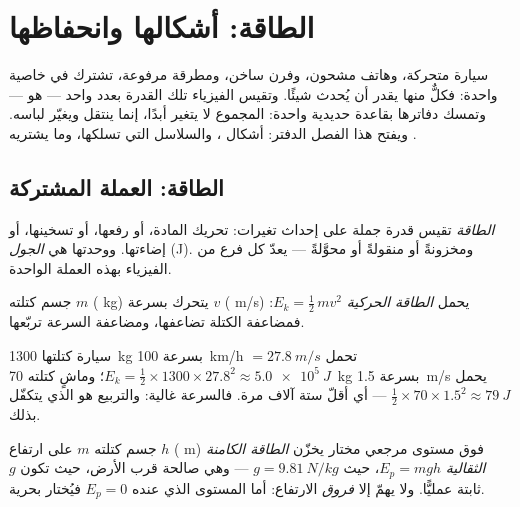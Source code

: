 \chapter{الطاقة: أشكالها وانحفاظها}\label{ch:g10:energy-conservation}

سيارة متحركة، وهاتف مشحون، وفرن ساخن، ومطرقة مرفوعة، تشترك في
خاصية واحدة: فكلٌّ منها يقدر أن يُحدث شيئًا. وتقيس الفيزياء تلك
القدرة بعدد واحد --- هو  --- وتمسك دفاترها
بقاعدة حديدية واحدة: المجموع لا يتغير أبدًا، إنما ينتقل ويغيّر
لباسه. ويفتح هذا الفصل الدفتر: أشكال ،
والسلاسل التي تسلكها، وما يشتريه .

\section{الطاقة: العملة المشتركة}

\begin{definition}\label{def:g10:energy-conservation:energy}
\emph{الطاقة} تقيس قدرة جملة على إحداث
تغيرات: تحريك المادة، أو رفعها، أو تسخينها، أو إضاءتها. ووحدتها
هي \emph{الجول} (\unit{J}). ومخزونةً أو منقولةً
أو محوَّلةً --- يعدّ كل فرع من الفيزياء بهذه العملة الواحدة.
\end{definition}

\begin{definition}\label{def:g10:energy-conservation:kinetic}
جسم كتلته $m$ ( \unit{kg}) يتحرك بسرعة $v$ (
\unit{m/s}) يحمل \emph{الطاقة الحركية}
$E_k = \tfrac12\, m v^2$: فمضاعفة الكتلة تضاعفها، ومضاعفة
السرعة تربّعها.
\end{definition}

\begin{example}\label{ex:g10:energy-conservation:kinetic}
سيارة كتلتها \qty{1300}{kg} بسرعة \qty{100}{km/h} $= \qty{27.8}{m/s}$ تحمل
$E_k = \tfrac12 \times 1300 \times 27.8^2 \approx \qty{5.0e5}{J}$؛
وماشٍ كتلته \qty{70}{kg} بسرعة \qty{1.5}{m/s} يحمل
$\tfrac12 \times 70 \times 1.5^2 \approx \qty{79}{J}$ --- أي أقلّ ستة
آلاف مرة. فالسرعة غالية: والتربيع هو الذي يتكفّل بذلك.
\end{example}

\begin{definition}\label{def:g10:energy-conservation:potential}
جسم كتلته $m$ على ارتفاع $h$ ( \unit{m}) فوق مستوى
مرجعي مختار يخزّن \emph{الطاقة الكامنة
الثقالية} $E_p = m g h$، حيث
$g = \qty{9.81}{N/kg}$ --- وهي صالحة قرب الأرض، حيث تكون $g$
ثابتة عمليًّا. ولا يهمّ إلا \emph{فروق} الارتفاع: أما
المستوى الذي عنده $E_p = 0$ فيُختار بحرية.
\end{definition}

